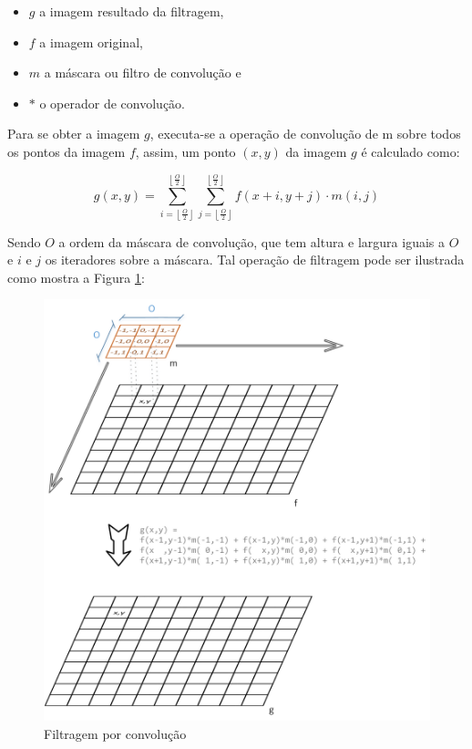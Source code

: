 \begin{itemize}
\item \(g\) a imagem resultado da filtragem, 
\item \(f\) a imagem original, 
\item \(m\) a máscara ou filtro de convolução e 
\item \(*\) o operador de convolução.
\end{itemize}

Para se obter a imagem \(g\), executa-se a operação de convolução de m sobre todos os pontos da imagem \(f\), assim, um ponto \((x,y)\) da imagem \(g\) é calculado como:
	
\[
g(x,y) = 
\sum_{i=\left\lfloor\frac{O}{2}\right\rfloor}^{\left\lfloor\frac{O}{2}\right\rfloor}
\sum_{j=\left\lfloor\frac{O}{2}\right\rfloor}^{\left\lfloor\frac{O}{2}\right\rfloor}  f(x+i, y+j) \cdot m(i,j)
\]

Sendo \(O\) a ordem da máscara de convolução, que tem altura e largura iguais a \(O\) e \(i\) e \(j\) os iteradores sobre a máscara. Tal operação de filtragem pode ser ilustrada como mostra a Figura \ref{fig:Convolution}:

\begin{figure}[h]
	\centering	
	\includegraphics[scale=0.55]{Figuras/Convolutio.png}
	\caption{Filtragem por convolução}
	\label{fig:Convolution}
\end{figure}

